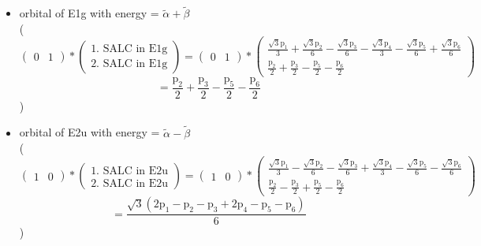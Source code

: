 \documentclass[12pt,a4paper]{article}
\begin{document}
\begin{itemize}
\item orbital of E1g with energy = 
                                $\tilde{\alpha} + \tilde{\beta}$ \\
( 
$$
\begin{pmatrix}0 & 1\end{pmatrix} * \left(\begin{array}{c}\text{1. SALC in E1g} \\ \text{2. SALC in E1g}\end{array}\right) = \begin{pmatrix}0 & 1\end{pmatrix} * \begin{pmatrix}\frac{\sqrt{3} \text{p}_{1}}{3} + \frac{\sqrt{3} \text{p}_{2}}{6} - \frac{\sqrt{3} \text{p}_{3}}{6} - \frac{\sqrt{3} \text{p}_{4}}{3} - \frac{\sqrt{3} \text{p}_{5}}{6} + \frac{\sqrt{3} \text{p}_{6}}{6}\\\frac{\text{p}_{2}}{2} + \frac{\text{p}_{3}}{2} - \frac{\text{p}_{5}}{2} - \frac{\text{p}_{6}}{2}\end{pmatrix} 
 $$ $$ = \frac{\text{p}_{2}}{2} + \frac{\text{p}_{3}}{2} - \frac{\text{p}_{5}}{2} - \frac{\text{p}_{6}}{2} 
 $$ 
 )

\item orbital of E2u with energy = 
                                $\tilde{\alpha} - \tilde{\beta}$ \\
( 
$$
\begin{pmatrix}1 & 0\end{pmatrix} * \left(\begin{array}{c}\text{1. SALC in E2u} \\ \text{2. SALC in E2u}\end{array}\right) = \begin{pmatrix}1 & 0\end{pmatrix} * \begin{pmatrix}\frac{\sqrt{3} \text{p}_{1}}{3} - \frac{\sqrt{3} \text{p}_{2}}{6} - \frac{\sqrt{3} \text{p}_{3}}{6} + \frac{\sqrt{3} \text{p}_{4}}{3} - \frac{\sqrt{3} \text{p}_{5}}{6} - \frac{\sqrt{3} \text{p}_{6}}{6}\\\frac{\text{p}_{2}}{2} - \frac{\text{p}_{3}}{2} + \frac{\text{p}_{5}}{2} - \frac{\text{p}_{6}}{2}\end{pmatrix} 
 $$ $$ = \frac{\sqrt{3} \left(2 \text{p}_{1} - \text{p}_{2} - \text{p}_{3} + 2 \text{p}_{4} - \text{p}_{5} - \text{p}_{6}\right)}{6} 
 $$ 
 )


\end{itemize}
\end{document}
